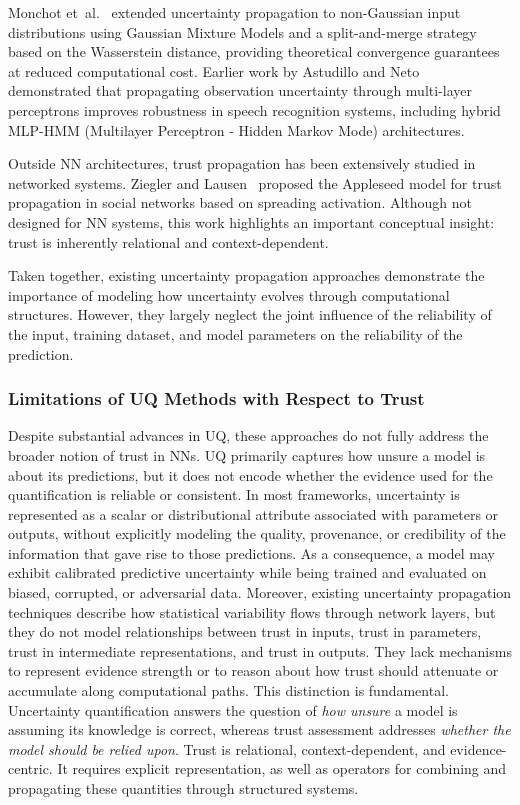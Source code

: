 Monchot et~al.~\cite{pmlr-v202-monchot23a} extended uncertainty propagation to non-Gaussian input distributions using Gaussian Mixture Models and a split-and-merge strategy based on the Wasserstein distance, providing theoretical convergence guarantees at reduced computational cost. Earlier work by Astudillo and Neto~\cite{astudillo2011propagation} demonstrated that propagating observation uncertainty through multi-layer perceptrons improves robustness in speech recognition systems, including hybrid MLP-HMM (Multilayer Perceptron - Hidden Markov Mode) architectures. 

Outside \ac{NN} architectures, trust propagation has been extensively studied in networked systems. Ziegler and Lausen~\cite{ziegler2004spreading} proposed the Appleseed model for trust propagation in social networks based on spreading activation. Although not designed for \ac{NN} systems, this work highlights an important conceptual insight: trust is inherently relational and context-dependent.

Taken together, existing uncertainty propagation approaches demonstrate the importance of modeling how uncertainty evolves through computational structures. However, they largely neglect the joint influence of the reliability of the input, training dataset, and model parameters on the reliability of the prediction. 

\subsubsection{Limitations of \ac{UQ} Methods with Respect to Trust}

Despite substantial advances in \ac{UQ}, these approaches do not fully address the broader notion of trust in \acp{NN}. \ac{UQ} primarily captures how unsure a model is about its predictions, but it does not encode whether the evidence used for the quantification is reliable or consistent. In most frameworks, uncertainty is represented as a scalar or distributional attribute associated with parameters or outputs, without explicitly modeling the quality, provenance, or credibility of the information that gave rise to those predictions. As a consequence, a model may exhibit calibrated predictive uncertainty while being trained and evaluated on biased, corrupted, or adversarial data. Moreover, existing uncertainty propagation techniques describe how statistical variability flows through network layers, but they do not model relationships between trust in inputs, trust in parameters, trust in intermediate representations, and trust in outputs. They lack mechanisms to represent evidence strength or to reason about how trust should attenuate or accumulate along computational paths. This distinction is fundamental. Uncertainty quantification answers the question of \emph{how unsure} a model is assuming its knowledge is correct, whereas trust assessment addresses \emph{whether the model should be relied upon}. Trust is relational, context-dependent, and evidence-centric. It requires explicit representation, as well as operators for combining and propagating these quantities through structured systems.

